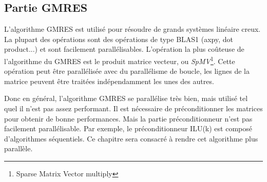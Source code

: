 \subsection{Partie GMRES}
L'algorithme GMRES est utilisé pour résoudre de grands systèmes linéaire creux.
%
La plupart des opérations sont des opérations de type BLAS1 (axpy, dot product...) et sont facilement parallélisables.
%
L'opération la plus coûteuse de l'algorithme du GMRES est le produit matrice vecteur, ou {\em SpMV}\footnote{Sparse Matrix Vector multiply}.
%
Cette opération peut être parallélisée avec du parallélisme de boucle, les lignes de la matrice peuvent être traitées indépendamment les unes des autres.


Donc en général, l'algorithme GMRES se parallélise très bien, mais utilisé tel quel il n'est pas assez performant.
%
Il est nécessaire de préconditionner les matrices pour obtenir de bonne performances.
%
Mais la partie préconditionneur n'est pas facilement parallélisable.
%
Par exemple, le préconditionneur ILU(k) est composé d'algorithmes séquentiels.
%
Ce chapitre sera consacré à rendre cet algorithme plus parallèle.



